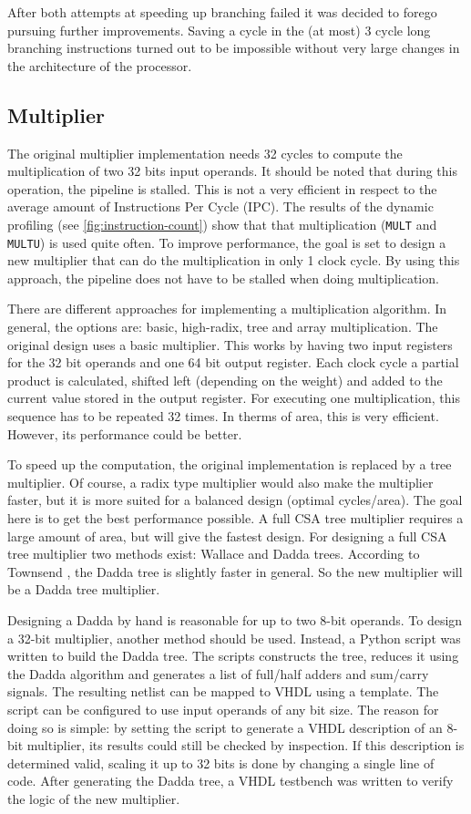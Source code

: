 \documentclass[final]{article}
\begin{document}
After both attempts at speeding up branching failed it was decided to forego pursuing further improvements. Saving a cycle in the (at most) 3 cycle long branching instructions turned out to be impossible without very large changes in the architecture of the processor.

\subsection{Multiplier}
The original multiplier implementation needs 32 cycles to compute the multiplication of two 32 bits input operands. It should be noted that during this operation, the pipeline is stalled. This is not a very efficient in respect to the average amount of Instructions Per Cycle (IPC). The results of the dynamic profiling (see \cref{fig:instruction-count}) show that that multiplication (\texttt{MULT} and \texttt{MULTU}) is used quite often. To improve performance, the goal is set to design a new multiplier that can do the multiplication in only 1 clock cycle. By using this approach, the pipeline does not have to be stalled when doing multiplication.

There are different approaches for implementing a multiplication algorithm. In general, the options are: basic, high-radix, tree and array multiplication. The original design uses a basic multiplier. This works by having two input registers for the 32 bit operands and one 64 bit output register. Each clock cycle a partial product is calculated, shifted left (depending on the weight) and added to the current value stored in the output register. For executing one multiplication, this sequence has to be repeated 32 times. In therms of area, this is very efficient. However, its performance could be better.

To speed up the computation, the original implementation is replaced by a tree multiplier. Of course, a radix type multiplier would also make the multiplier faster, but it is more suited for a balanced design (optimal cycles/area). The goal here is to get the best performance possible. A full CSA tree multiplier requires a large amount of area, but will give the fastest design. For designing a full CSA tree multiplier two methods exist: Wallace and Dadda trees. According to Townsend \cite{townsend}, the Dadda tree is slightly faster in general. So the new multiplier will be a Dadda tree multiplier.

Designing a Dadda by hand is reasonable for up to two 8-bit operands. To design a 32-bit multiplier, another method should be used. Instead, a Python script was written to build the Dadda tree. The scripts constructs the tree, reduces it using the Dadda algorithm and generates a list of full/half adders and sum/carry signals. The resulting netlist can be mapped to VHDL using a template. The script can be configured to use input operands of any bit size. The reason for doing so is simple: by setting the script to generate a VHDL description of an 8-bit multiplier, its results could still be checked by inspection. If this description is determined valid, scaling it up to 32 bits is done by changing a single line of code. After generating the Dadda tree, a VHDL testbench was written to verify the logic of the new multiplier.
\end{document}
